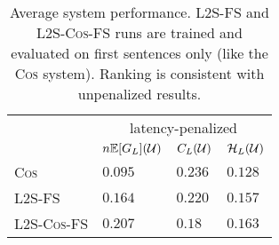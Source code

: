 \begin{table}[t]
  \center
  \begin{tabular}{ l   l l l  }
\toprule
    &\multicolumn{3}{c}{latency-penalized}\\
\cmidrule(lr){2-4} 
    & $n\mathbb{E}[G_L](\mathcal{U})$     & $C_L(\mathcal{U})$ & $\mathcal{H}_L(\mathcal{U})$ \\
    \midrule
    \textsc{Cos}  & $0.095$ & $\mathbf{0.236}$ & $0.128$ \\
     \textsc{L2S-FS}  & $0.164$ & $0.220$ & $0.157$ \\
    \textsc{L2S-Cos-FS} & 
      $\mathbf{0.207}$ & $0.18~~$ & $\mathbf{0.163}$ \\
\bottomrule
  \end{tabular}
  \caption{Average system performance. \textsc{L2S-FS} and \textsc{L2S-Cos-FS} 
           runs are trained and evaluated on first sentences only (like the 
           \textsc{Cos} system). Ranking is consistent with unpenalized results.}
  \label{tab:results-trunc}
\end{table}


